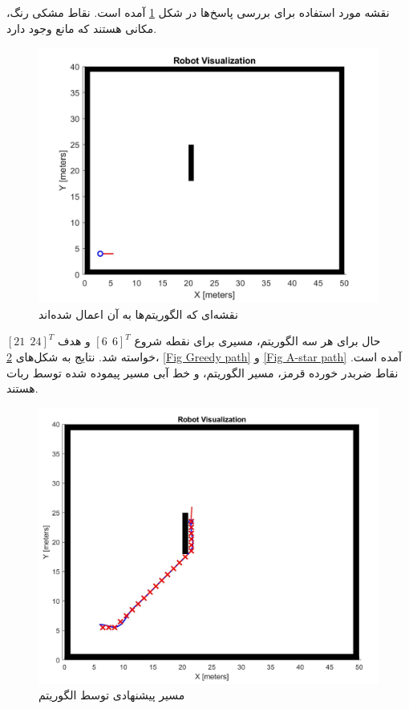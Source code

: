 نقشه مورد استفاده برای بررسی پاسخ‌ها در شکل \ref{Fig mapRooz} آمده است. نقاط مشکی رنگ، مکانی هستند که مانع وجود دارد.
\begin{figure}[!h]
	\centering
	\includegraphics[scale=0.35]{Images/mapRooz.jpg}
	\caption{نقشه‌ای که الگوریتم‌ها به آن اعمال شده‌اند}\label{Fig mapRooz}
\end{figure}

حال برای هر سه الگوریتم، مسیری برای نقطه شروع $[6~~6]^T$ و هدف $[21~~24]^T$ خواسته شد. نتایج به شکل‌های \ref{Fig BFS path}، \ref{Fig Greedy path} و \ref{Fig A-star path} آمده است. نقاط ضربدر خورده قرمز، مسیر الگوریتم، و خط آبی مسیر پیموده شده توسط ربات هستند.
\begin{figure}[!h]
	\centering
	\includegraphics[scale=0.35]{Images/BFS path.jpg}
	\caption{مسیر پیشنهادی توسط الگوریتم }\label{Fig BFS path}
\end{figure}

